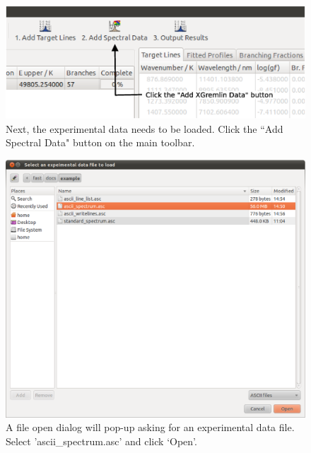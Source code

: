 \documentclass[a4paper,12pt]{report}
\begin{document}
\begin{figure}\centering
\includegraphics[scale=0.37]{Tutorial4a.eps}
\caption{Next, the experimental data needs to be loaded. Click the ``Add Spectral Data" button on the main toolbar.}
\label{fig:tut4a}
\end{figure}

\begin{figure}\centering
\includegraphics[width=140mm]{Tutorial4.eps}
\caption{A file open dialog will pop-up asking for an experimental data file. Select 'ascii\_spectrum.asc' and click `Open'.}
\label{fig:tut4}
\end{figure}
\end{document}
